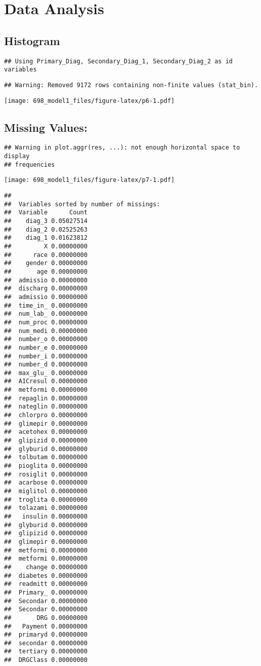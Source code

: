 \documentclass[11pt,]{article}
\begin{document}
\newpage

\section{Data Analysis}\label{data-analysis}

\subsection{Histogram}\label{histogram}

\begin{verbatim}
## Using Primary_Diag, Secondary_Diag_1, Secondary_Diag_2 as id variables
\end{verbatim}

\begin{verbatim}
## Warning: Removed 9172 rows containing non-finite values (stat_bin).
\end{verbatim}

\texttt{[image: 698\_model1\_files/figure-latex/p6-1.pdf]}

\newpage

\subsection{Missing Values:}\label{missing-values}

\begin{verbatim}
## Warning in plot.aggr(res, ...): not enough horizontal space to display
## frequencies
\end{verbatim}

\texttt{[image: 698\_model1\_files/figure-latex/p7-1.pdf]}

\begin{verbatim}
## 
##  Variables sorted by number of missings: 
##  Variable      Count
##    diag_3 0.05027514
##    diag_2 0.02525263
##    diag_1 0.01623812
##         X 0.00000000
##      race 0.00000000
##    gender 0.00000000
##       age 0.00000000
##  admissio 0.00000000
##  discharg 0.00000000
##  admissio 0.00000000
##  time_in_ 0.00000000
##  num_lab_ 0.00000000
##  num_proc 0.00000000
##  num_medi 0.00000000
##  number_o 0.00000000
##  number_e 0.00000000
##  number_i 0.00000000
##  number_d 0.00000000
##  max_glu_ 0.00000000
##  A1Cresul 0.00000000
##  metformi 0.00000000
##  repaglin 0.00000000
##  nateglin 0.00000000
##  chlorpro 0.00000000
##  glimepir 0.00000000
##  acetohex 0.00000000
##  glipizid 0.00000000
##  glyburid 0.00000000
##  tolbutam 0.00000000
##  pioglita 0.00000000
##  rosiglit 0.00000000
##  acarbose 0.00000000
##  miglitol 0.00000000
##  troglita 0.00000000
##  tolazami 0.00000000
##   insulin 0.00000000
##  glyburid 0.00000000
##  glipizid 0.00000000
##  glimepir 0.00000000
##  metformi 0.00000000
##  metformi 0.00000000
##    change 0.00000000
##  diabetes 0.00000000
##  readmitt 0.00000000
##  Primary_ 0.00000000
##  Secondar 0.00000000
##  Secondar 0.00000000
##       DRG 0.00000000
##   Payment 0.00000000
##  primaryd 0.00000000
##  secondar 0.00000000
##  tertiary 0.00000000
##  DRGClass 0.00000000
\end{verbatim}
\end{document}

